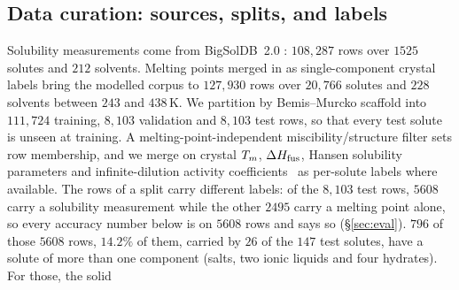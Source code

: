\subsection{Data curation: sources, splits, and labels}
\label{sec:data}
Solubility measurements come from BigSolDB~2.0 \cite{krasnov2025bigsoldb}: $108{,}287$ rows over
$1525$ solutes and $212$ solvents. Melting points merged in as single-component crystal labels bring
the modelled corpus to $127{,}930$ rows over $20{,}766$ solutes and $228$ solvents between $243$ and
$438$\,K. We partition by Bemis--Murcko
scaffold \cite{bemis1996} into $111{,}724$ training, $8{,}103$ validation and $8{,}103$ test rows, so that every test
solute is unseen at training. A melting-point-independent miscibility/structure filter sets row
membership, and we merge on crystal $T_m$, $\Delta H_{\mathrm{fus}}$, Hansen solubility parameters and
infinite-dilution activity
coefficients \lngi\ as per-solute labels where available. The rows of a split carry
different labels: of the $8{,}103$ test rows, $5608$ carry a solubility measurement while the
other $2495$ carry a melting point alone, so every accuracy number below is on $5608$
rows and says so (\S\ref{sec:eval}).
$796$ of those $5608$ rows, $14.2\%$ of them, carried by $26$ of the $147$ test solutes, have a
solute of more than one component (salts, two ionic liquids and four hydrates). For those, the solid
